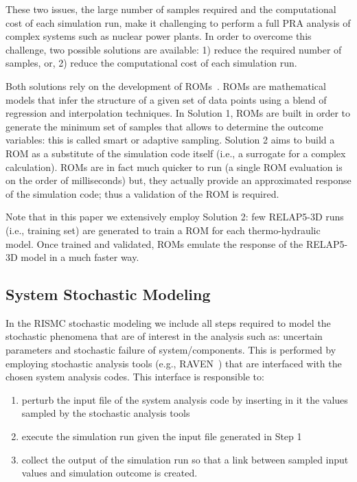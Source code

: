 These two issues, the large number of samples required and the computational cost of each simulation run, 
make it challenging to perform a full PRA analysis of complex systems such as nuclear power plants.  
In order to overcome this challenge, two possible solutions are available: 1) reduce the required 
number of samples, or, 2) reduce the computational cost of each simulation run.

Both solutions rely on the development of ROMs~\cite{ROM_Khalik}. 
ROMs are mathematical models that infer the structure of a given set of data points using a
blend of regression and interpolation techniques. In Solution 1, ROMs are built in order to generate 
the minimum set of samples that allows to determine the outcome variables: this is called smart or 
adaptive sampling. 
Solution 2 aims to build a ROM as a substitute of the simulation 
code itself (i.e., a surrogate for a complex calculation).  ROMs are in fact much quicker to run 
(a single ROM evaluation is on the order of milliseconds) but, they actually provide an approximated response 
of the simulation code; thus a validation of the ROM is required. 

Note that in this paper we extensively employ Solution 2: few RELAP5-3D runs (i.e., training set) are 
generated to train a ROM for each thermo-hydraulic model. Once trained and validated, 
ROMs emulate the response of the RELAP5-3D model in a much faster way. 

\subsection{System Stochastic Modeling}
In the RISMC stochastic modeling we include all steps required to model the 
stochastic phenomena that are of interest in the analysis such as: uncertain parameters and stochastic 
failure of system/components.
This is performed by employing stochastic analysis tools (e.g., RAVEN~\cite{RAVEN_PSAM_2014}) that are 
interfaced with the chosen system analysis codes. This interface is responsible to:

\begin{enumerate}
  \item perturb the input file of the system analysis code by inserting in it the values sampled by the
        stochastic analysis tools
  \item execute the simulation run given the input file generated in Step 1
  \item collect the output of the simulation run so that a link between sampled input values and simulation 
        outcome is created.      
\end{enumerate}

